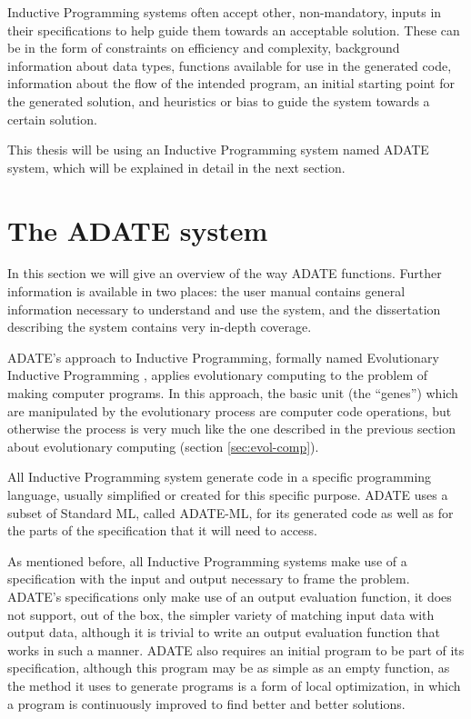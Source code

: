 Inductive Programming systems often accept other, non-mandatory, inputs in their
specifications to help guide them towards an acceptable solution. These can be
in the form of constraints on efficiency and complexity, background information
about data types, functions available for use in the generated code, information
about the flow of the intended program, an initial starting point for the
generated solution, and heuristics or bias to guide the system towards a certain
solution.

This thesis will be using an Inductive Programming system named ADATE system,
which will be explained in detail in the next section.

\section{The ADATE system}
\label{sec:adate-system}

In this section we will give an overview of the way ADATE functions. Further
information is available in two places: the user manual
\citep{vattekar2006adate} contains general information necessary to understand
and use the system, and the dissertation describing the system
\citep{olsson1994inductive} contains very in-depth coverage.

ADATE's approach to Inductive Programming, formally named Evolutionary Inductive
Programming \citep{crossleycombining}, applies evolutionary computing to the
problem of making computer programs. In this approach, the basic unit (the
``genes'') which are manipulated by the evolutionary process are computer code
operations, but otherwise the process is very much like the one described in the
previous section about evolutionary computing (section \ref{sec:evol-comp}).


All Inductive Programming system generate code in a specific programming
language, usually simplified or created for this specific purpose. ADATE uses a
subset of Standard ML, called ADATE-ML, for its generated code as well as for
the parts of the specification that it will need to access.
\citep[see][Chap.~3]{vattekar2006adate}

As mentioned before, all Inductive Programming systems make use of a
specification with the input and output necessary to frame the problem. ADATE's
specifications only make use of an output evaluation function, it does not
support, out of the box, the simpler variety of matching input data with output
data, although it is trivial to write an output evaluation function that works
in such a manner. ADATE also requires an initial program to be part of its
specification, although this program may be as simple as an empty function, as
the method it uses to generate programs is a form of local optimization, in
which a program is continuously improved to find better and better solutions.

